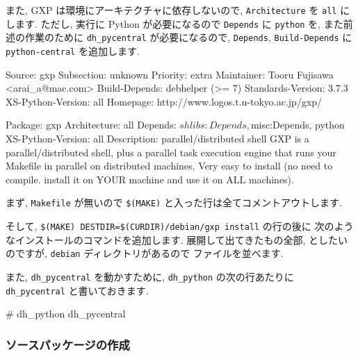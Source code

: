 \documentclass[mingoth,a4paper]{jsarticle}
\begin{document}
また, GXP は環境にアーキテクチャに依存しないので, \verb|Architecture| を
\verb|all| にします.
ただし, 実行に Python が必要になるので \verb|Depends| に \verb|python| を,
また前述の作業のために \verb|dh_pycentral| が必要になるので,
\verb|Depends|, \verb|Build-Depends| に \verb|python-central| を追加します.

\begin{commandline}
Source: gxp
Subsection: unknown
Priority: extra
Maintainer: Tooru Fujisawa <arai_a@mac.com>
Build-Depends: debhelper (>= 7)
Standards-Version: 3.7.3
XS-Python-Version: all
Homepage: http://www.logos.t.u-tokyo.ac.jp/gxp/

Package: gxp
Architecture: all
Depends: ${shlibs:Depends}, ${misc:Depends}, python
XS-Python-Version: all
Description: parallel/distributed shell
 GXP is a parallel/distributed shell, plus a parallel task execution engine
 that runs your Makefile in parallel on distributed machines.
 Very easy to install
 (no need to compile. install it on YOUR machine and use it on ALL machines). 
\end{commandline}


まず, \verb|Makefile| が無いので \verb|$(MAKE)| と入った行は全てコメントアウトします.

そして, \verb|$(MAKE) DESTDIR=$(CURDIR)/debian/gxp install| の行の後に
次のようなインストールのコマンドを追加します.
展開して出てきたもの全部, としたいのですが, \verb|debian| ディレクトリがあるので
ファイルを並べます.


また, \verb|dh_pycentral| を動かすために, \verb|dh_python| の次の行あたりに
\verb|dh_pycentral| と書いておきます.

\begin{commandline}
#       dh_python
        dh_pycentral
\end{commandline}

\subsubsection{ソースパッケージの作成}
\end{document}
